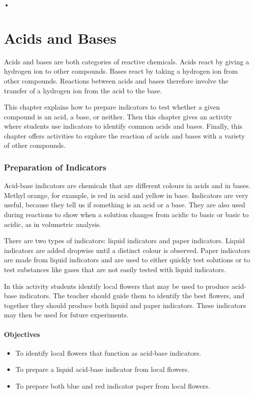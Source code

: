 \begin{flushleft}
•
\end{flushleft}\chapter{Acids and Bases}

Acids and bases are both categories of reactive chemicals. Acids react by giving a hydrogen ion to other compounds. Bases react by taking a hydrogen ion from other compounds. Reactions between acids and bases therefore involve the transfer of a hydrogen ion from the acid to the base.

This chapter explains how to prepare indicators to test whether a given compound is an acid, a base, or neither. Then this chapter gives an activity where students use indicators to identify common acids and bases. Finally, this chapter offers activities to explore the reaction of acids and bases with a variety of other compounds.

\subsection{Preparation of Indicators}

Acid-base indicators are chemicals that are different colours in acids and in bases. Methyl orange, for example, is red in acid and yellow in base. Indicators are very useful, because they tell us if something is an acid or a base. They are also used during reactions to show when a solution changes from acidic to basic or basic to acidic, as in volumetric analysis.

There are two types of indicators: liquid indicators and paper indicators. Liquid indicators are added dropwise until a distinct colour is observed. Paper indicators are made from liquid indicators and are used to either quickly test solutions or to test substances like gases that are not easily tested with liquid indicators.

In this activity students identify local flowers that may be used to produce acid-base indicators. The teacher should guide them to identify the best flowers, and together they should produce both liquid and paper indicators. These indicators may then be used for future experiments.

\subsubsection*{Objectives}
\begin{itemize}
\item{To identify local flowers that function as acid-base indicators.}
\item{To prepare a liquid acid-base indicator from local flowers.}
\item{To prepare both blue and red indicator paper from local flowers.}
\end{itemize}

